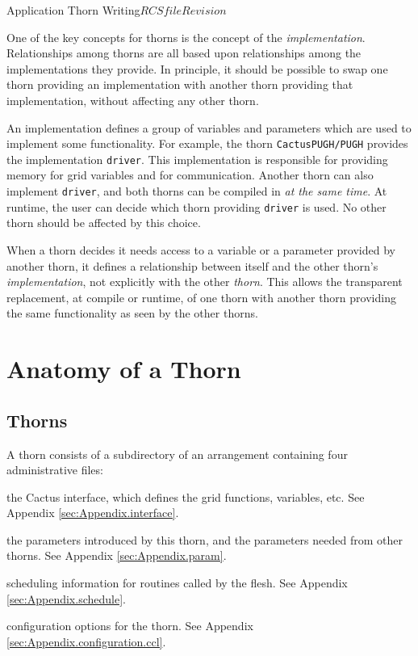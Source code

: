 \begin{cactuspart}{Application Thorn Writing}{$RCSfile$}{$Revision$}
\label{sec:implementations}

One of the key concepts for thorns is the concept of the \textit{implementation}.
Relationships among thorns are all based upon relationships among the
implementations they provide.
In principle, it should be possible to swap one thorn providing an
implementation with another thorn providing that implementation,
without affecting any other thorn.

An implementation defines a group of variables and parameters which
are used to implement some functionality.  For example, the thorn
\texttt{CactusPUGH/PUGH} provides the implementation \texttt{driver}.  This
implementation is responsible for providing memory for grid variables and
for communication.  Another thorn can also implement \texttt{driver},
and both thorns can be compiled in \emph{at the same time}.
At runtime, the user can decide which thorn providing \texttt{driver} is used.
No other thorn should be affected by this choice.

When a thorn decides it needs access to a variable or a parameter provided by
another thorn, it defines a relationship between itself and the other thorn's
\emph{implementation}, not explicitly with the other \emph{thorn}.
This allows the transparent replacement, at compile or runtime, of one
thorn with another thorn providing the same functionality as seen by
the other thorns.


\chapter{Anatomy of a Thorn}
\label{chap:thorn_anatomy}


\section{Thorns}

A thorn consists of a subdirectory of an arrangement containing four
administrative files:

\begin{Lentry}
\item[\texttt{interface.ccl}] the Cactus interface, which defines the grid
functions, variables, etc. See Appendix \ref{sec:Appendix.interface}.
\item[\texttt{param.ccl}] the parameters introduced by this thorn, and the
parameters needed from other thorns. See  Appendix 
\ref{sec:Appendix.param}.
\item[\texttt{schedule.ccl}] scheduling information for routines called by
the flesh. See Appendix  \ref{sec:Appendix.schedule}.
\item[\texttt{configuration.ccl}] configuration options for the thorn. See
 Appendix  \ref{sec:Appendix.configuration.ccl}.
\end{Lentry}


\end{cactuspart}
